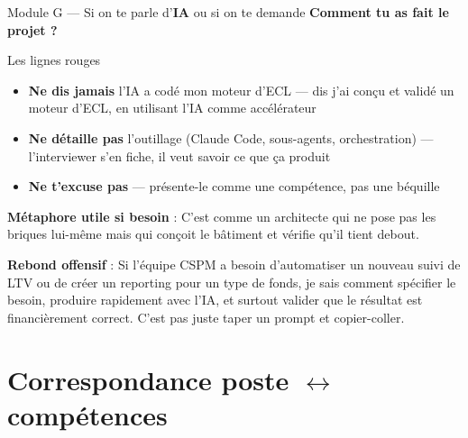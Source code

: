 \documentclass[11pt,a4paper]{article}
\begin{document}
\begin{modulebox}{Module G --- Si on te parle d'\textbf{IA} ou si on te demande \textbf{\og Comment tu as fait le projet ? \fg{}}}
\begin{dangerbox}{Les lignes rouges}
\begin{itemize}[nosep, leftmargin=12pt]
\item \textbf{Ne dis jamais} \og l'IA a cod\'e mon moteur d'ECL \fg{}
      --- dis \og j'ai con\c{c}u et valid\'e un moteur d'ECL, en utilisant l'IA comme acc\'el\'erateur \fg{}
\item \textbf{Ne d\'etaille pas} l'outillage (Claude Code, sous-agents, orchestration)
      --- l'interviewer s'en fiche, il veut savoir ce que \c{c}a produit
\item \textbf{Ne t'excuse pas} --- pr\'esente-le comme une comp\'etence, pas une b\'equille
\end{itemize}
\end{dangerbox}

\textbf{M\'etaphore utile si besoin} : \og C'est comme un architecte qui ne pose pas
les briques lui-m\^eme mais qui con\c{c}oit le b\^atiment et v\'erifie qu'il tient debout. \fg{}

\textbf{Rebond offensif} : \og Si l'\'equipe CSPM a besoin d'automatiser un nouveau
suivi de LTV ou de cr\'eer un reporting pour un type de fonds, je sais comment
sp\'ecifier le besoin, produire rapidement avec l'IA, et surtout valider que le
r\'esultat est financièrement correct. C'est pas juste taper un prompt et copier-coller. \fg{}

\end{modulebox}

\vspace{10pt}

\section{Correspondance poste $\leftrightarrow$ comp\'etences}
\end{document}
